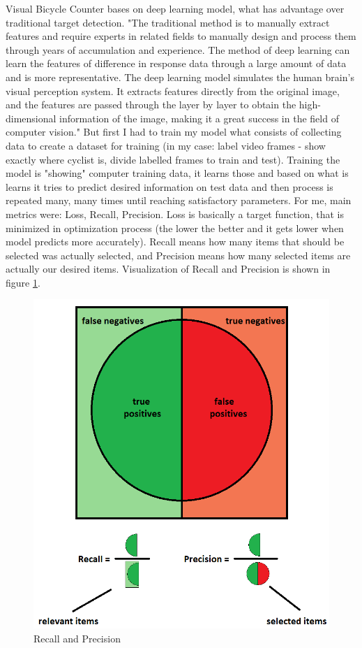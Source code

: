 Visual Bicycle Counter bases on deep learning model, what has advantage over traditional target detection. "The traditional method is to manually extract features and require experts in related fields to manually design and process them through years of accumulation and experience. The method of deep learning can learn the features of difference in response data through a large amount of data and is more representative. The deep learning model simulates the human brain's visual perception system. It extracts features directly from the original image, and the features are passed through the layer by layer to obtain the high-dimensional information of the image, making it a great success in the field of computer vision."\cite{deepLearning} But first I had to train my model what consists of collecting data to create a dataset for training (in my case: label video frames - show exactly where cyclist is, divide labelled frames to train and test). Training the model is "showing" computer training data, it learns those and based on what is learns it tries to predict desired information on test data and then process is repeated many, many times until reaching satisfactory parameters. For me, main metrics were: Loss, Recall, Precision. Loss is basically a target function, that is minimized in optimization process (the lower the better and it gets lower when model predicts more accurately). Recall means how many items that should be selected was actually selected, and Precision means how many selected items are actually our desired items. Visualization of Recall and Precision is shown in figure \ref{fig:RPL}.

\begin{figure}[H]
    \centering
    \includegraphics[scale=0.5]{images/rpl}
    \caption{Recall and Precision}
    \label{fig:RPL}
\end{figure}

